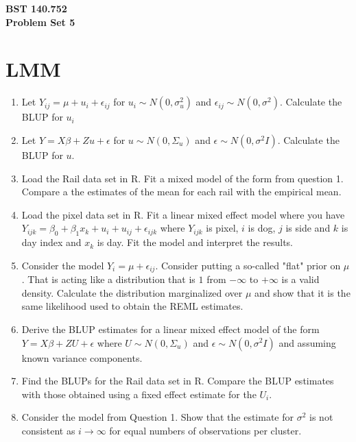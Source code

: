 \documentclass[12pt]{article}
\begin{document}
\noindent
{\bf BST 140.752 \\ Problem Set 5} \\

\section{LMM}
\begin{enumerate}
\item Let $Y_{ij} = \mu + u_i + \epsilon_{ij}$ for $u_i \sim N(0,\sigma^2_u)$ and $\epsilon_{ij} \sim N(0, \sigma^2)$. Calculate the BLUP 
for $u_i$
\item Let $Y = X \beta + Z u + \epsilon$ for $u \sim N(0,\Sigma_u)$ and $\epsilon \sim N(0, \sigma^2 I)$. Calculate the BLUP for $u$. 
\item Load the Rail data set in R. Fit a mixed model of the form from question 1. Compare a the estimates of the mean for each rail with the empirical mean.	
\item Load the pixel data set in R. Fit a linear mixed effect model where you have $Y_{ijk} = \beta_0 + \beta_1 x_{k} + u_{i} + u_{ij} + \epsilon_{ijk}$
where $Y_{ijk}$ is pixel, $i$ is dog, $j$ is side and $k$ is day index and $x_k$ is day. Fit the model and interpret the results.
\item Consider the model $Y_{i} = \mu + \epsilon_{ij}$. Consider putting a so-called "flat" prior on $\mu$. That is acting like a distribution
that is $1$ from $-\infty$ to $+\infty$ is a valid density. Calculate the distribution marginalized over $\mu$ and show that it is the same likelihood
used to obtain the REML estimates.
\item Derive the BLUP estimates for a linear mixed effect model of the 
form $Y = X\beta + Z U + \epsilon$ where $U \sim N(0, \Sigma_u)$
and $\epsilon \sim N(0, \sigma^2 I)$ and 
assuming known variance components. 
\item Find the BLUPs for the Rail data set in R. Compare the BLUP estimates
with those obtained using a fixed effect estimate for the $U_i$.
\item Consider the model from Question 1. Show that the estimate for 
$\sigma^2$ is not consistent as $i \rightarrow \infty$ for equal
numbers of observations per cluster. 

\end{enumerate}
\end{document}
